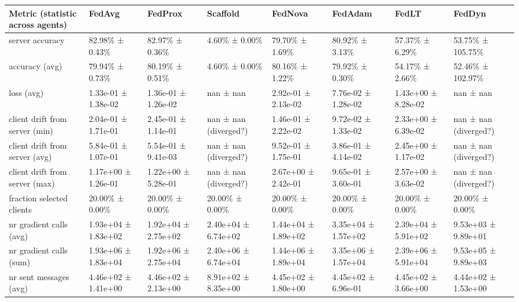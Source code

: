 \begin{tabular}{llllllll}
\hline
 Metric (statistic across agents)   & FedAvg              & FedProx             & Scaffold              & FedNova             & FedAdam             & FedLT               & FedDyn                \\
\hline
 server accuracy                    & 82.98\% ± 0.43\%      & 82.97\% ± 0.36\%      & 4.60\% ± 0.00\%         & 79.70\% ± 1.69\%      & 80.92\% ± 3.13\%      & 57.37\% ± 6.29\%      & 53.75\% ± 105.75\%      \\
 accuracy (avg)                     & 79.94\% ± 0.73\%      & 80.19\% ± 0.51\%      & 4.60\% ± 0.00\%         & 80.16\% ± 1.22\%      & 79.92\% ± 0.30\%      & 54.17\% ± 2.66\%      & 52.46\% ± 102.97\%      \\
 loss (avg)                         & 1.33e-01 ± 1.38e-02 & 1.36e-01 ± 1.26e-02 & nan ± nan             & 2.92e-01 ± 2.13e-02 & 7.76e-02 ± 1.28e-02 & 1.43e+00 ± 8.28e-02 & nan ± nan             \\
 client drift from server (min)     & 2.04e-01 ± 1.71e-01 & 2.45e-01 ± 1.14e-01 & nan ± nan (diverged?) & 1.46e-01 ± 2.22e-02 & 9.72e-02 ± 1.33e-02 & 2.33e+00 ± 6.39e-02 & nan ± nan (diverged?) \\
 client drift from server (avg)     & 5.84e-01 ± 1.07e-01 & 5.54e-01 ± 9.41e-03 & nan ± nan (diverged?) & 9.52e-01 ± 1.75e-01 & 3.86e-01 ± 4.14e-02 & 2.45e+00 ± 1.17e-02 & nan ± nan (diverged?) \\
 client drift from server (max)     & 1.17e+00 ± 1.26e-01 & 1.22e+00 ± 5.28e-01 & nan ± nan (diverged?) & 2.67e+00 ± 2.42e-01 & 9.65e-01 ± 3.60e-01 & 2.57e+00 ± 3.63e-02 & nan ± nan (diverged?) \\
 fraction selected clients          & 20.00\% ± 0.00\%      & 20.00\% ± 0.00\%      & 20.00\% ± 0.00\%        & 20.00\% ± 0.00\%      & 20.00\% ± 0.00\%      & 20.00\% ± 0.00\%      & 20.00\% ± 0.00\%        \\
 nr gradient calls (avg)            & 1.93e+04 ± 1.83e+02 & 1.92e+04 ± 2.75e+02 & 2.40e+04 ± 6.74e+02   & 1.44e+04 ± 1.89e+02 & 3.35e+04 ± 1.57e+02 & 2.39e+04 ± 5.91e+02 & 9.53e+03 ± 9.89e+01   \\
 nr gradient calls (sum)            & 1.93e+06 ± 1.83e+04 & 1.92e+06 ± 2.75e+04 & 2.40e+06 ± 6.74e+04   & 1.44e+06 ± 1.89e+04 & 3.35e+06 ± 1.57e+04 & 2.39e+06 ± 5.91e+04 & 9.53e+05 ± 9.89e+03   \\
 nr sent messages (avg)             & 4.46e+02 ± 1.41e+00 & 4.46e+02 ± 2.13e+00 & 8.91e+02 ± 8.35e+00   & 4.45e+02 ± 1.80e+00 & 4.45e+02 ± 6.96e-01 & 4.45e+02 ± 3.66e+00 & 4.44e+02 ± 1.53e+00   \\

\end{tabular}
